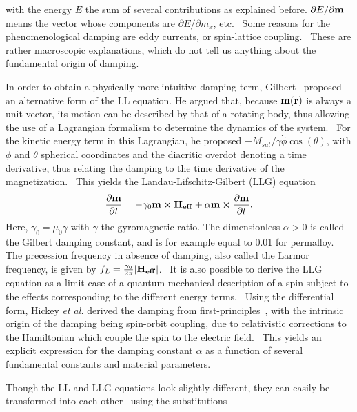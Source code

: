 \documentclass[11pt,a4paper,english]{article}
\begin{document}
with the energy $E$ the sum of several contributions as explained before. $\partial E/\partial \vb{m}$ means the vector whose components are $\partial E/\partial m_x$, etc.~\cite{ThermFluc_SingleDomain} Some reasons for the phenomenological damping are eddy currents, or spin-lattice coupling.~\cite{phd_leliaert} These are rather macroscopic explanations, which do not tell us anything about the fundamental origin of damping.
\par
In order to obtain a physically more intuitive damping term, Gilbert~\cite{Gilbert1955ALF} proposed an alternative form of the LL equation. He argued that, because $\vb{m}(\vb{r})$ is always a unit vector, its motion can be described by that of a rotating body, thus allowing the use of a Lagrangian formalism to determine the dynamics of the system.~\cite{abert2013discrete} For the kinetic energy term in this Lagrangian, he proposed $-M_{sat}/\gamma \dot{\phi} \cos(\theta)$, with $\phi$ and $\theta$ spherical coordinates and the diacritic overdot denoting a time derivative, thus relating the damping to the time derivative of the magnetization.~\cite{abert2013discrete} This yields the Landau-Lifschitz-Gilbert (LLG) equation~\cite{ThermFluc_SingleDomain, phd_leliaert, LEL-17b}
\begin{equation}
    \frac{\partial \vb{m}}{\partial t} = - \gamma_0 \vb{m} \cross \vb{H_{eff}} + \alpha \vb{m} \cross \frac{\partial \vb{m}}{\partial t} \mathrm{.}
    \label{eq:LLG}
\end{equation}
Here, $\gamma_0=\mu_0 \gamma$ with $\gamma$ the gyromagnetic ratio. The dimensionless $\alpha > 0$ is called the Gilbert damping constant, and is for example equal to 0.01 for permalloy. The precession frequency in absence of damping, also called the Larmor frequency, is given by  $f_L=\frac{\gamma_0}{2\pi}\abs{\vb{H_{eff}}}$.~\cite{phd_leliaert} 
It is also possible to derive the LLG equation as a limit case of a quantum mechanical description of a spin subject to the effects corresponding to the different energy terms.~\cite{abert2013discrete,bode2012current}
Using the differential form, Hickey \textit{et al.} derived the damping from first-principles~\cite{hickey2009origin}, with the intrinsic origin of the damping being spin-orbit coupling, due to relativistic corrections to the Hamiltonian which couple the spin to the electric field.~\cite{hickey2009origin} This yields an explicit expression for the damping constant $\alpha$ as a function of several fundamental constants and material parameters. \par
Though the LL and LLG equations look slightly different, they can easily be transformed into each other~\cite{ThermFluc_SingleDomain,phd_leliaert} using the substitutions
\end{document}
